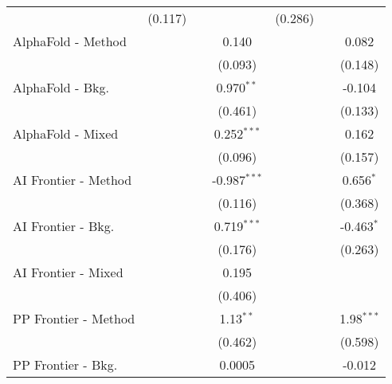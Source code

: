 \begin{tabular}{lcccccc}
                                  & (0.117)        &               &                & (0.286)       &         &   \\   
   AlphaFold - Method             &                &               & 0.140          &               &         & 0.082\\   
                                  &                &               & (0.093)        &               &         & (0.148)\\   
   AlphaFold - Bkg.               &                &               & 0.970$^{**}$   &               &         & -0.104\\   
                                  &                &               & (0.461)        &               &         & (0.133)\\   
   AlphaFold - Mixed              &                &               & 0.252$^{***}$  &               &         & 0.162\\   
                                  &                &               & (0.096)        &               &         & (0.157)\\   
   AI Frontier - Method           &                &               & -0.987$^{***}$ &               &         & 0.656$^{*}$\\   
                                  &                &               & (0.116)        &               &         & (0.368)\\   
   AI Frontier - Bkg.             &                &               & 0.719$^{***}$  &               &         & -0.463$^{*}$\\   
                                  &                &               & (0.176)        &               &         & (0.263)\\   
   AI Frontier - Mixed            &                &               & 0.195          &               &         &   \\   
                                  &                &               & (0.406)        &               &         &   \\   
   PP Frontier - Method           &                &               & 1.13$^{**}$    &               &         & 1.98$^{***}$\\   
                                  &                &               & (0.462)        &               &         & (0.598)\\   
   PP Frontier - Bkg.             &                &               & 0.0005         &               &         & -0.012\\   

\end{tabular}
